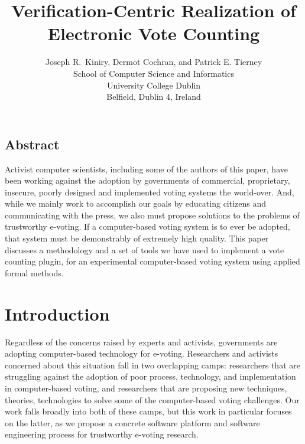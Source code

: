 \documentclass[letterpaper,twocolumn,10pt]{article}
\begin{document}
\date{}

\title{\Large \bf Verification-Centric Realization of Electronic Vote Counting}

\author{{\rm Joseph R.~Kiniry, Dermot Cochran, and Patrick E. Tierney}\\
School of Computer Science and Informatics\\
University College Dublin\\
Belfield, Dublin 4, Ireland}

\maketitle

\thispagestyle{empty}

\subsection*{Abstract}

Activist computer scientists, including some of the authors of this
paper, have been working against the adoption by governments of commercial,
proprietary, insecure, poorly designed and implemented voting systems
the world-over.  And, while we mainly work to accomplish our goals by educating
citizens and communicating with the press, we also must propose solutions to the
problems of trustworthy e-voting.  If a computer-based voting system is to ever
be adopted, that system must be demonstrably of extremely high quality.  This
paper discusses a methodology and a set of tools we have used to implement a
vote counting plugin, for an experimental computer-based voting system using
applied formal methods.

\section{Introduction}

Regardless of the concerns raised by experts and activists, governments are
adopting computer-based technology for e-voting.  Researchers and
activists concerned about this situation fall in two overlapping
camps: researchers that are struggling against the adoption of poor
process, technology, and implementation in computer-based voting, and
researchers that are proposing new techniques, theories, technologies
to solve some of the computer-based voting challenges.  Our
work falls broadly into both of these camps, but this work in
particular focuses on the latter, as we propose a concrete software
platform and software engineering process for trustworthy e-voting
research.
\end{document}
